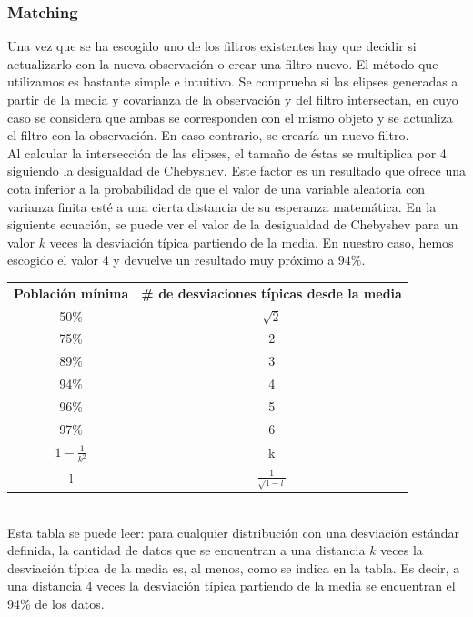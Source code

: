 \subsubsection{Matching}
\label{subsubsec:Matching}

Una vez que se ha escogido uno de los filtros existentes hay que decidir si actualizarlo con la nueva observación o crear una filtro nuevo. El método que utilizamos es bastante simple e intuitivo. Se comprueba si las elipses generadas a partir de la media y covarianza de la observación y del filtro intersectan, en cuyo caso se considera que ambas se corresponden con el mismo objeto y se actualiza el filtro con la observación. En caso contrario, se crearía un nuevo filtro. \\

Al calcular la intersección de las elipses, el tamaño de éstas se multiplica por 4 siguiendo la desigualdad de Chebyshev. Este factor es un resultado que ofrece una cota inferior a la probabilidad de que el valor de una variable aleatoria con varianza finita esté a una cierta distancia de su esperanza matemática. En la siguiente ecuación, se puede ver el valor de la desigualdad de Chebyshev para un valor $k$ veces la desviación típica partiendo de la media. En nuestro caso, hemos escogido el valor 4 y devuelve un resultado muy próximo a $94\%$. \\

\begin{tabular}{cc}
  \textbf{Población mínima} & \textbf{\# de desviaciones típicas desde la media} \\
  50\% & $\sqrt{2}$ \\
  75\% & 2 \\ 
  89\% & 3 \\
  94\% & 4 \\
  96\% & 5 \\
  97\% & 6 \\
  $1-\frac{1}{k^2}$ & k \\
  l & $\frac{1}{\sqrt{1-l}}$
\end{tabular}
\\

Esta tabla se puede leer: para cualquier distribución con una desviación estándar definida, la cantidad de datos que se encuentran a una distancia $k$ veces la desviación típica de la media es, al menos, como se indica en la tabla. Es decir, a una distancia 4 veces la desviación típica partiendo de la media se encuentran el 94\% de los datos. \\

